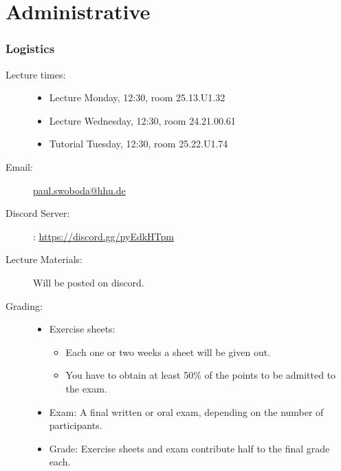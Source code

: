 \section*{Administrative}

\begin{frame}
    \frametitle{Logistics}
    \begin{description}
        \item[Lecture times:] 
        \begin{itemize}
        \item Lecture Monday, 12:30, room 25.13.U1.32
        \item Lecture Wednesday, 12:30, room 24.21.00.61
        \item Tutorial Tuesday, 12:30, room 25.22.U1.74
        \end{itemize}
    \item[Email:] \href{paul.swoboda@hhu.de}{paul.swoboda@hhu.de}
    \item[Discord Server:] : \href{https://discord.gg/pyEdkHTpm}{https://discord.gg/pyEdkHTpm}
    \item[Lecture Materials:] Will be posted on discord.
    \pause 
    \item[Grading:] 
    \begin{itemize}
        \item Exercise sheets: 
        \begin{itemize}
            \item Each one or two weeks a sheet will be given out.
            \item You have to obtain at least 50\% of the points to be admitted to the exam.
        \end{itemize}
        \pause \item Exam: A final written or oral exam, depending on the number of participants.
        \pause \item Grade: Exercise sheets and exam contribute half to the final grade each.
    \end{itemize}
    \end{description}
\end{frame}

